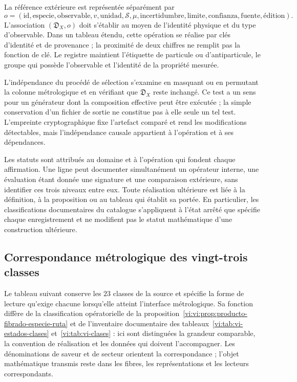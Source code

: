 La référence extérieure est représentée séparément par
\[
 o=(\mathrm{id},\mathrm{especie},\mathrm{observable},
      v,\mathrm{unidad},\mathscr S,\mu,
      \mathrm{incertidumbre},\text{limite},\mathrm{confianza},
      \mathrm{fuente},\text{édition}).
\]
L’association \((\mathfrak D_X,o)\) doit s’établir au moyen de
l’identité physique et du type d’observable. Dans un tableau étendu, cette
opération se réalise par clés d’identité et de provenance ; la proximité
de deux chiffres ne remplit pas la fonction de clé. Le registre maintient
l’étiquette de particule ou d’antiparticule, le groupe qui possède l’observable et
l’identité de la propriété mesurée.

L’indépendance du procédé de sélection s’examine en masquant ou en
permutant la colonne métrologique et en vérifiant que \(\mathfrak D_X\)
reste inchangé. Ce test a un sens pour un générateur dont la
composition effective peut être exécutée ; la simple conservation d’un fichier
de sortie ne constitue pas à elle seule un tel test. L’empreinte cryptographique
fixe l’artefact comparé et rend les modifications détectables, mais
l’indépendance causale appartient à l’opération et à ses dépendances.

Les statuts sont attribués au domaine et à l’opération qui fondent chaque
affirmation. Une ligne peut documenter simultanément un opérateur interne,
une évaluation étant donnée une signature et une comparaison extérieure, sans identifier
ces trois niveaux entre eux. Toute réalisation ultérieure est liée à la
définition, à la proposition ou au tableau qui établit sa portée. En particulier, les
classifications documentaires du catalogue s’appliquent à l’état arrêté que spécifie
chaque enregistrement et ne modifient pas le statut mathématique d’une construction
ultérieure.

\subsection{Correspondance métrologique des vingt-trois classes}
\label{vi:subsec:vi-clases-metrologia}

Le tableau suivant conserve les \(23\) classes de la source et spécifie la
forme de lecture qu’exige chacune lorsqu’elle atteint l’interface métrologique. Sa
fonction diffère de la classification opératorielle de la
proposition~\ref{vi:vi:prop:producto-fibrado-especie-ruta} et de l’inventaire
documentaire des tableaux~\ref{vi:tab:vi-estados-clases} et~\ref{vi:tab:vi-clases} :
ici sont distinguées la grandeur comparable, la convention de réalisation et
les données qui doivent l’accompagner. Les dénominations de saveur et de secteur
orientent la correspondance ; l’objet mathématique transmis reste dans
les fibres, les représentations et les lecteurs correspondants.

